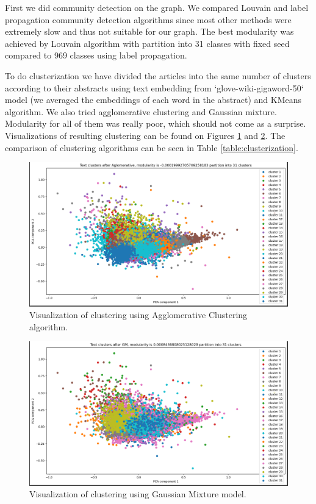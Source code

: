 \documentclass{article}
\begin{document}
First we did community detection on the graph. We compared Louvain and label propagation community detection algorithms since most other methods were extremely slow and thus not suitable for our graph. The best modularity was achieved by Louvain algorithm with partition into 31 classes with fixed seed compared to 969 classes using label propagation. 

To do clusterization we have divided the articles into the same number of clusters according to their abstracts using text embedding from `glove-wiki-gigaword-50` model (we averaged the embeddings of each word in the abstract) and KMeans algorithm. We also tried agglomerative clustering and Gaussian mixture. Modularity for all of them was really poor, which should not come as a surprise. Visualizations of resulting clustering can be found on Figures \ref{plot:clustering:agglomerative} and \ref{plot:clustering:gaussian_mixture}. The comparison of clustering algorithms can be seen in Table \ref{table:clusterization}.

\begin{figure}[h]
\centering
\includegraphics[width=1\linewidth]{Aglomerative.png}
\caption{Visualization of clustering using Agglomerative Clustering algorithm.}
\label{plot:clustering:agglomerative}
\end{figure}

\begin{figure}[h]
\centering
\includegraphics[width=1\linewidth]{gm.png}
\caption{Visualization of clustering using Gaussian Mixture model.}
\label{plot:clustering:gaussian_mixture}
\end{figure}
\end{document}
